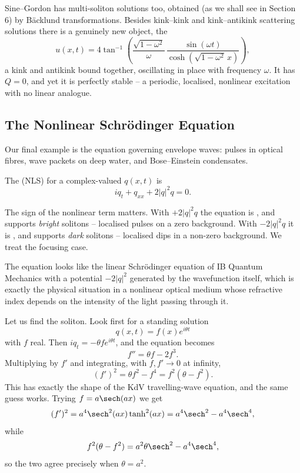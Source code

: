 \begin{remark}
	Sine--Gordon has multi-soliton solutions too, obtained (as we shall see in Section 6) by B\"acklund transformations. Besides kink--kink and kink--antikink scattering solutions there is a genuinely new object, the 
	$$
	u(x,t) = 4\tan^{-1}\left(\frac{\sqrt{1-\omega^2}}{\omega}\,\frac{\sin(\omega t)}{\cosh\left(\sqrt{1-\omega^2}\,x\right)}\right),
	$$
	a kink and antikink bound together, oscillating in place with frequency $\omega$. It has $Q = 0$, and yet it is perfectly stable -- a periodic, localised, nonlinear excitation with no linear analogue.
\end{remark}

\subsection{The Nonlinear Schr\"odinger Equation}

Our final example is the equation governing envelope waves: pulses in optical fibres, wave packets on deep water, and Bose--Einstein condensates.

\begin{definition}
	The  (NLS) for a complex-valued $q(x,t)$ is
	$$
	iq_t + q_{xx} + 2|q|^2q = 0.
	$$
\end{definition}

The sign of the nonlinear term matters. With $+2|q|^2q$ the equation is , and supports \emph{bright} solitons -- localised pulses on a zero background. With $-2|q|^2q$ it is , and supports \emph{dark} solitons -- localised dips in a non-zero background. We treat the focusing case.

The equation looks like the linear Schr\"odinger equation of IB Quantum Mechanics with a potential $-2|q|^2$ generated by the wavefunction itself, which is exactly the physical situation in a nonlinear optical medium whose refractive index depends on the intensity of the light passing through it.

Let us find the soliton. Look first for a standing solution
$$
q(x,t) = f(x)e^{i\theta t}
$$
with $f$ real. Then $iq_t = -\theta fe^{i\theta t}$, and the equation becomes
$$
f'' = \theta f - 2f^3.
$$
Multiplying by $f'$ and integrating, with $f, f'\to0$ at infinity,
$$
(f')^2 = \theta f^2 - f^4 = f^2\left(\theta - f^2\right).
$$
This has exactly the shape of the KdV travelling-wave equation, and the same guess works. Trying $f = a\sech(ax)$ we get
$$
(f')^2 = a^4\sech^2(ax)\tanh^2(ax) = a^4\sech^2 - a^4\sech^4,
$$
while
$$
f^2(\theta - f^2) = a^2\theta\sech^2 - a^4\sech^4,
$$
so the two agree precisely when $\theta = a^2$.

